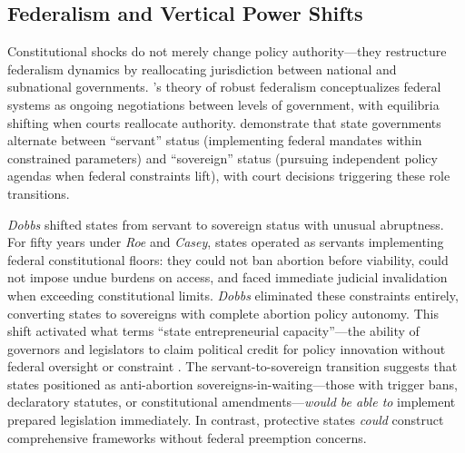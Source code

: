 \subsection{Federalism and Vertical Power Shifts}
Constitutional shocks do not merely change policy authority---they restructure federalism dynamics by reallocating jurisdiction between national and subnational governments. \textcite{bednarRobustFederationPrinciples2009}'s theory of robust federalism conceptualizes federal systems as ongoing negotiations between levels of government, with equilibria shifting when courts reallocate authority. \textcite{bulman-pozenUncooperativeFederalism2009} demonstrate that state governments alternate between ``servant'' status (implementing federal mandates within constrained parameters) and ``sovereign'' status (pursuing independent policy agendas when federal constraints lift), with court decisions triggering these role transitions.

\emph{Dobbs} shifted states from servant to sovereign status with unusual abruptness. For fifty years under \emph{Roe} and \emph{Casey}, states operated as servants implementing federal constitutional floors: they could not ban abortion before viability, could not impose undue burdens on access, and faced immediate judicial invalidation when exceeding constitutional limits. \emph{Dobbs} eliminated these constraints entirely, converting states to sovereigns with complete abortion policy autonomy. This shift activated what \textcite{nugentSafeguardingFederalismHow2009} terms ``state entrepreneurial capacity''---the ability of governors and legislators to claim political credit for policy innovation without federal oversight or constraint \parencite{nugentSafeguardingFederalismHow2009}. The servant-to-sovereign transition suggests that states positioned as anti-abortion sovereigns-in-waiting---those with trigger bans, declaratory statutes, or constitutional amendments---\textit{would be able to} implement prepared legislation immediately. In contrast, protective states \textit{could} construct comprehensive frameworks without federal preemption concerns.

